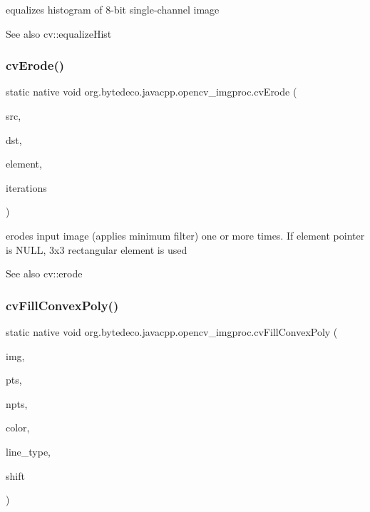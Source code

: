 equalizes histogram of 8-\/bit single-\/channel image 

\begin{DoxySeeAlso}{See also}
cv\+::equalize\+Hist 
\end{DoxySeeAlso}
\mbox{\label{group__imgproc__c_ga8b958e2b5185910eba9b44400bb1d3b8}} 
\subsubsection{\texorpdfstring{cv\+Erode()}{cvErode()}}
{\footnotesize\ttfamily static native void org.\+bytedeco.\+javacpp.\+opencv\+\_\+imgproc.\+cv\+Erode (\begin{DoxyParamCaption}\item[{@Const Cv\+Arr}]{src,  }\item[{Cv\+Arr}]{dst,  }\item[{Ipl\+Conv\+Kernel}]{element,  }\item[{int}]{iterations }\end{DoxyParamCaption})\hspace{0.3cm}{\ttfamily [static]}}



erodes input image (applies minimum filter) one or more times. If element pointer is N\+U\+LL, 3x3 rectangular element is used 

\begin{DoxySeeAlso}{See also}
cv\+::erode 
\end{DoxySeeAlso}
\mbox{\label{group__imgproc__c_ga78d1444aef347e816876c749259ebcc2}} 
\subsubsection{\texorpdfstring{cv\+Fill\+Convex\+Poly()}{cvFillConvexPoly()}}
{\footnotesize\ttfamily static native void org.\+bytedeco.\+javacpp.\+opencv\+\_\+imgproc.\+cv\+Fill\+Convex\+Poly (\begin{DoxyParamCaption}\item[{Cv\+Arr}]{img,  }\item[{@Const Cv\+fr.antproject.utils.Point}]{pts,  }\item[{int}]{npts,  }\item[{@By\+Val Cv\+Scalar}]{color,  }\item[{int}]{line\+\_\+type,  }\item[{int}]{shift }\end{DoxyParamCaption})\hspace{0.3cm}{\ttfamily [static]}}



